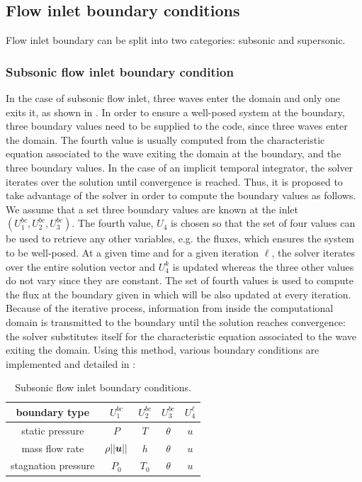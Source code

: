 \subsection{Flow inlet boundary conditions} \label{sec:flow-inlet-bc}
Flow inlet boundary can be split into two categories: subsonic and supersonic.
\subsubsection{Subsonic flow inlet boundary condition} \label{sec:sub-flow-inlet-bc}
In the case of subsonic flow inlet, three waves enter the domain and only one exits it, as shown in . In order to ensure a well-posed system at the boundary, three boundary values need to be supplied to the code, since three waves enter the domain. The fourth value is usually computed from the characteristic equation associated to the wave exiting the domain at the boundary, and the three boundary values. In the case of an implicit temporal integrator, the solver iterates over the solution until convergence is reached. Thus, it is proposed to take advantage of the solver in order to compute the boundary values as follows. We assume that a set three boundary values are known at the inlet $\left(U_1^{bc}, U_2^{bc}, U_3^{bc}\right)$. The fourth value, $U_4$ is chosen so that the set of four values can be used to retrieve any other variables, e.g. the fluxes, which ensures the system to be well-posed. At a given time and for a given iteration $\ell$, the solver iterates over the entire solution vector and $U_4^k$ is updated whereas the three other values do not vary since they are constant. The set of fourth values is used to compute the flux at the boundary given in  which will be also updated at every iteration. Because of the iterative process, information from inside the computational domain is transmitted to the boundary until the solution reaches convergence: the solver substitutes itself for the characteristic equation associated to the wave exiting the domain. Using this method, various boundary conditions are implemented and detailed in :
%
\begin{table}[H]
\begin{center}
\caption{ Subsonic flow inlet boundary conditions.}
\label{tbl:sub-inlet-flow-bc}
\begin{tabular}{|c|c|c|c|c|}
 \hline
boundary type & $U_1^{bc}$  & $U_2^{bc}$ & $U_3^{bc}$ & $U_4^{\ell}$ \\  \hline
static pressure & $P$     & $T$    & $\theta$  & $u$     \\  \hline
mass flow rate  & $\rho|| \boldsymbol u||$     & $h$  & $\theta$  & $u$     \\  \hline
stagnation pressure & $P_0$  & $T_0$    & $\theta$  & $u$     \\  \hline
\end{tabular}
\end{center}
\end{table}
